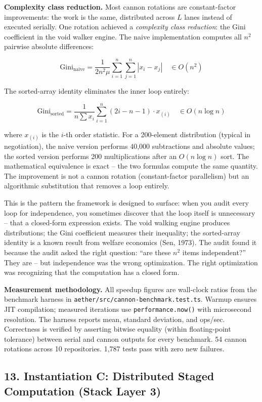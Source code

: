 \documentclass[
  11pt,
]{article}
\begin{document}
\textbf{Complexity class reduction.}  Most cannon rotations are constant-factor improvements: the work is the same, distributed across \(L\) lanes instead of executed serially.  One rotation achieved a \emph{complexity class reduction}: the Gini coefficient in the void walker engine.  The naive implementation computes all \(n^2\) pairwise absolute differences:

\[\text{Gini}_{\text{naive}} = \frac{1}{2 n^2 \mu} \sum_{i=1}^{n} \sum_{j=1}^{n} |x_i - x_j| \quad \in O(n^2)\]

The sorted-array identity eliminates the inner loop entirely:

\[\text{Gini}_{\text{sorted}} = \frac{1}{n \sum x_i} \sum_{i=1}^{n} (2i - n - 1) \cdot x_{(i)} \quad \in O(n \log n)\]

where \(x_{(i)}\) is the \(i\)-th order statistic.  For a 200-element distribution (typical in negotiation), the naive version performs 40,000 subtractions and absolute values; the sorted version performs 200 multiplications after an \(O(n \log n)\) sort.  The mathematical equivalence is exact -- the two formulas compute the same quantity.  The improvement is not a cannon rotation (constant-factor parallelism) but an algorithmic substitution that removes a loop entirely.

This is the pattern the framework is designed to surface: when you audit every loop for independence, you sometimes discover that the loop itself is unnecessary -- that a closed-form expression exists.  The void walking engine produces distributions; the Gini coefficient measures their inequality; the sorted-array identity is a known result from welfare economics (Sen, 1973).  The audit found it because the audit asked the right question: ``are these \(n^2\) items independent?''  They are -- but independence was the wrong optimization.  The right optimization was recognizing that the computation has a closed form.

\textbf{Measurement methodology.}  All speedup figures are wall-clock ratios from the benchmark harness in \texttt{aether/src/cannon-benchmark.test.ts}.  Warmup ensures JIT compilation; measured iterations use \texttt{performance.now()} with microsecond resolution.  The harness reports mean, standard deviation, and ops/sec.  Correctness is verified by asserting bitwise equality (within floating-point tolerance) between serial and cannon outputs for every benchmark.  54 cannon rotations across 10 repositories.  1,787 tests pass with zero new failures.

\subsection{13. Instantiation C: Distributed Staged Computation (Stack
Layer
3)}\label{instantiation-c-distributed-staged-computation-stack-layer-3}
\end{document}
